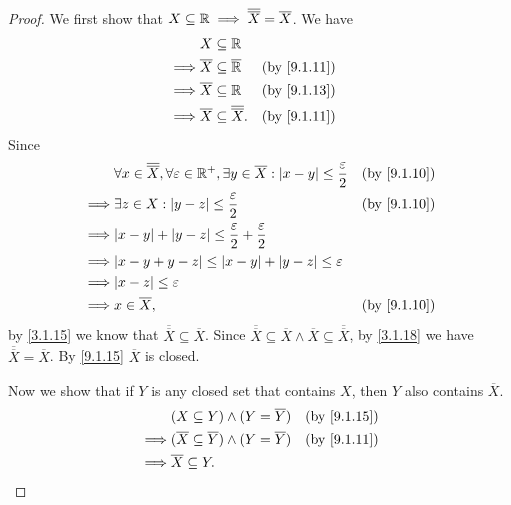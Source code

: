 \begin{proof}
	We first show that \(X \subseteq \mathbb{R} \implies \overline{\overline{X}} = \overline{X}\).
	We have
	\begin{align*}
		         & X \subseteq \R                                                   \\
		\implies & \overline{X} \subseteq \overline{\R}            &  & \by{9.1.11} \\
		\implies & \overline{X} \subseteq \R                       &  & \by{9.1.13} \\
		\implies & \overline{X} \subseteq \overline{\overline{X}}. &  & \by{9.1.11}
	\end{align*}
	Since
	\begin{align*}
		         & \forall x \in \overline{\overline{X}}, \forall \varepsilon \in \R^+, \exists y \in \overline{X} : \abs{x - y} \leq \dfrac{\varepsilon}{2} &  & \by{9.1.10} \\
		\implies & \exists z \in X : \abs{y - z} \leq \dfrac{\varepsilon}{2}                                                                                 &  & \by{9.1.10} \\
		\implies & \abs{x - y} + \abs{y - z} \leq \dfrac{\varepsilon}{2} + \dfrac{\varepsilon}{2}                                                                             \\
		\implies & \abs{x - y + y - z} \leq \abs{x - y} + \abs{y - z} \leq \varepsilon                                                                                        \\
		\implies & \abs{x - z} \leq \varepsilon                                                                                                                               \\
		\implies & x \in \overline{X},                                                                                                                       &  & \by{9.1.10}
	\end{align*}
	by \cref{3.1.15} we know that \(\overline{\overline{X}} \subseteq \overline{X}\).
	Since \(\overline{\overline{X}} \subseteq \overline{X} \land \overline{X} \subseteq \overline{\overline{X}}\), by \cref{3.1.18} we have \(\overline{\overline{X}} = \overline{X}\).
	By \cref{9.1.15} \(\overline{X}\) is closed.

	Now we show that if \(Y\) is any closed set that contains \(X\), then \(Y\) also contains \(\overline{X}\).
	\begin{align*}
		         & (X \subseteq Y) \land (Y = \overline{Y})                       &  & \by{9.1.15} \\
		\implies & (\overline{X} \subseteq \overline{Y}) \land (Y = \overline{Y}) &  & \by{9.1.11} \\
		\implies & \overline{X} \subseteq Y.
	\end{align*}
\end{proof}

